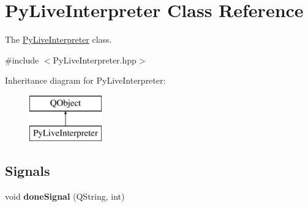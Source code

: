 \hypertarget{classPyLiveInterpreter}{\section{Py\+Live\+Interpreter Class Reference}
\label{classPyLiveInterpreter}
}


The \hyperlink{classPyLiveInterpreter}{Py\+Live\+Interpreter} class.  




{\ttfamily \#include $<$Py\+Live\+Interpreter.\+hpp$>$}

Inheritance diagram for Py\+Live\+Interpreter\+:\begin{figure}[H]
\begin{center}
\leavevmode
\includegraphics[height=2.000000cm]{classPyLiveInterpreter}
\end{center}
\end{figure}
\subsection*{Signals}
\begin{DoxyCompactItemize}
\item 
\hypertarget{classPyLiveInterpreter_a4571972ede3e0fb04f6eaf1720acae5c}{void {\bfseries done\+Signal} (Q\+String, int)}\label{classPyLiveInterpreter_a4571972ede3e0fb04f6eaf1720acae5c}

\end{DoxyCompactItemize}
